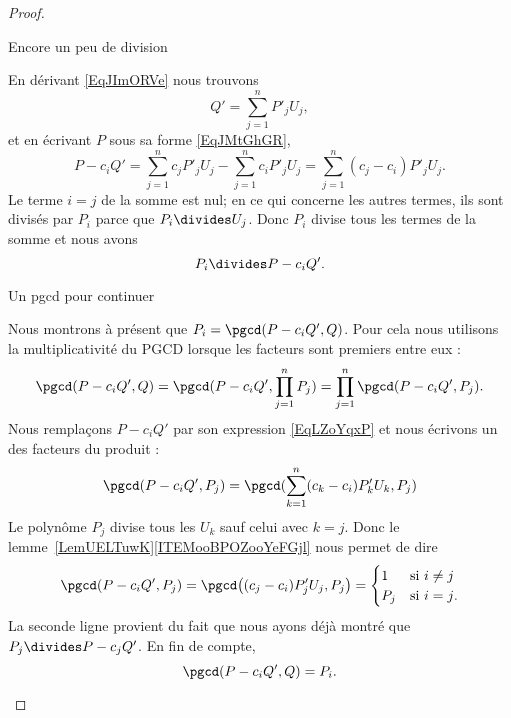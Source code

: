 \begin{proof}
\begin{subproof}
\item[Encore un peu de division]

    En dérivant \eqref{EqJImORVe} nous trouvons
    \begin{equation}
        Q'=\sum_{j=1}^nP'_jU_j,
    \end{equation}
    et en écrivant \( P\) sous sa forme \eqref{EqJMtGhGR},
    \begin{equation}    \label{EqLZoYqxP}
        P-c_iQ'=\sum_{j=1}^nc_jP'_jU_j-\sum_{j=1}^nc_iP'_jU_j=\sum_{j=1}^n(c_j-c_i)P'_jU_j.
    \end{equation}
    Le terme \( i=j\) de la somme est nul; en ce qui concerne les autres termes, ils sont divisés par \( P_i\) parce que \( P_i\divides U_j\). Donc \( P_i\) divise tous les termes de la somme et nous avons
    \begin{equation}
        P_i\divides P-c_iQ'.
    \end{equation}

\item[Un pgcd pour continuer]

    Nous montrons à présent que \( P_i=\pgcd(P-c_iQ',Q)\). Pour cela nous utilisons la multiplicativité du PGCD lorsque les facteurs sont premiers entre eux :
    \begin{equation}
        \pgcd(P-c_iQ',Q)=\pgcd(P-c_iQ',\prod_{j=1}^nP_j)=\prod_{j=1}^n\pgcd(P-c_iQ',P_j).
    \end{equation}
    Nous remplaçons \( P-c_iQ'\) par son expression \eqref{EqLZoYqxP} et nous écrivons un des facteurs du produit :
    \begin{equation}
        \pgcd(P-c_iQ',P_j)=\pgcd(\sum_{k=1}^n(c_k-c_i)P'_kU_k,P_j)
    \end{equation}
    Le polynôme \( P_j\) divise tous les \( U_k\) sauf celui avec \( k=j\). Donc le lemme~\ref{LemUELTuwK}\ref{ITEMooBPOZooYeFGjl} nous permet de dire
    \begin{equation}
        \pgcd(P-c_iQ',P_j)=\pgcd\big( (c_j-c_i)P'_jU_j,P_j \big)=\begin{cases}
            1    &   \text{si } i\neq j\\
            P_j    &    \text{si } i=j\text{.}
        \end{cases}
    \end{equation}
    La seconde ligne provient du fait que nous ayons déjà montré que \( P_j\divides P-c_jQ'\). En fin de compte,
    \begin{equation}
        \pgcd(P-c_iQ',Q)=P_i.
    \end{equation}


\end{subproof}
\end{proof}
